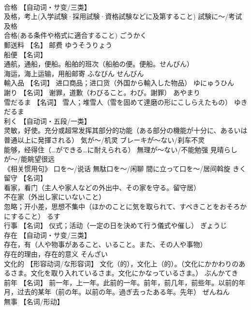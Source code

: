 \documentclass[8pt]{extreport}
\begin{document}
\begin{CJK}{UTF8}{min}
\\	合格	【自动词・サ变/三类】 
\\	及格，考上(入学試験·採用試験·資格試験などに及第すること) 試験に～/考试及格 
\\	合格(ある条件や格式に適合すること)	ごうかく	
\\	郵送料	【名】 邮费	ゆうそうりょう	
\\	船便	【名词】 
\\	通航，通船，便船。船舶的班次（船舶の便。便船。せんびん） 
\\	海运，海上运输，用船邮寄	ふなびん せんびん	
\\	輸入品	【名词】 进口商品；进口货（外国から輸入した物品）	ゆにゅうひん	
\\	謝り	【名词】 谢罪，道歉（わびること。わび。謝罪）	あやまり	
\\	雪だるま	【名词】 雪人；堆雪人（雪を固めて達磨の形にこしらえたもの）	ゆきだるま	
\\	利く	【自动词・五段/一类】 
\\	灵敏，好使。充分或超常发挥其部分的功能（ある部分の機能が十分に、あるいは普通以上に発揮される） 気が〜/机灵 ブレーキが〜ない/刹车不灵 
\\	能够，经得住（…ができる…に耐えられる） 無理が〜ない/不能勉强 見晴らしが〜/能眺望很远 
\\	《相关惯用句》 口を〜/说话 無駄口を〜/闲聊 間に立って口を〜/居间斡旋	きく	
\\	留守	【名词】 
\\	看家，看门（主人や家人などの外出中、その家を守る。留守居） 
\\	不在家（外出し家にいないこと） 
\\	忽略；开小差，思想不集中（ほかのことに気を取られて、すべきことをおそろかにすること）	るす	
\\	行事	【名词】 仪式；活动（一定の日を決めて行う儀式や催し）	ぎょうじ	
\\	存在	【自动词・サ变/三类】 
\\	存在，有（人や物事があること、いること。また、その人や事物） 
\\	存在的理由，存在的意义	そんざい	
\\	文化的	【形容动词/な形容词】 文化（的），文化上（的）。（文化にかかわりのあるさま。文化を取り入れているさま。文化にかなっているさま。）	ぶんかてき	
\\	前年	【名词】 前一年，上一年。此前的一年。前年，前几年，前些年。以前的年月，过去的某年（前の年。以前の年。過ぎ去ったある年。先年）	ぜんねん	
\\	無事	【名词/形动】 

\end{CJK}
\end{document}
